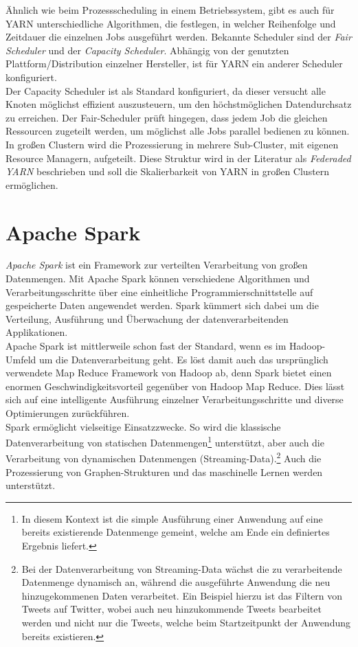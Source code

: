 \noindent
Ähnlich wie beim Prozessscheduling in einem Betriebssystem, gibt es auch für YARN unterschiedliche Algorithmen, die festlegen, in welcher Reihenfolge und Zeitdauer die einzelnen Jobs ausgeführt werden. Bekannte Scheduler sind der \textit{Fair Scheduler} und der \textit{Capacity Scheduler}. Abhängig von der genutzten Plattform/Distribution einzelner Hersteller, ist für YARN ein anderer Scheduler konfiguriert.\\
Der Capacity Scheduler ist als Standard konfiguriert, da dieser versucht alle Knoten möglichst effizient auszusteuern, um den höchstmöglichen Datendurchsatz zu erreichen. Der Fair-Scheduler prüft hingegen, dass jedem Job die gleichen Ressourcen zugeteilt werden, um möglichst alle Jobs parallel bedienen zu können.\\

\noindent
In großen Clustern wird die Prozessierung in mehrere Sub-Cluster, mit eigenen Resource Managern, aufgeteilt. Diese Struktur wird in der Literatur als \textit{Federaded YARN} beschrieben und soll die Skalierbarkeit von YARN in großen Clustern ermöglichen.

\section{Apache Spark}
\label{sec:theory_spark}

\textit{Apache Spark\texttrademark\thinspace} ist ein Framework zur verteilten Verarbeitung von großen Datenmengen. Mit Apache Spark können verschiedene Algorithmen und Verarbeitungsschritte über eine einheitliche Programmierschnittstelle auf gespeicherte Daten  angewendet werden. Spark kümmert sich dabei um die Verteilung, Ausführung und Überwachung der datenverarbeitenden Applikationen.\cite[S. 2]{learning_spark}\\
Apache Spark ist mittlerweile schon fast der Standard, wenn es im Hadoop-Umfeld um die Datenverarbeitung geht. Es löst damit auch das ursprünglich verwendete Map Reduce Framework von Hadoop ab, denn Spark bietet einen enormen Geschwindigkeitsvorteil gegenüber von Hadoop Map Reduce. Dies lässt sich auf eine intelligente Ausführung einzelner Verarbeitungsschritte und diverse Optimierungen zurückführen.\cite[S. 148-153]{expert_hadoop_admin}\\

\noindent
Spark ermöglicht vielseitige Einsatzzwecke. So wird die klassische Datenverarbeitung von statischen Datenmengen\footnote{In diesem Kontext ist die simple Ausführung einer Anwendung auf eine bereits existierende Datenmenge gemeint, welche am Ende ein definiertes Ergebnis liefert.} unterstützt, aber auch die Verarbeitung von dynamischen Datenmengen (Streaming-Data).\footnote{Bei der Datenverarbeitung von Streaming-Data wächst die zu verarbeitende Datenmenge dynamisch an, während die ausgeführte Anwendung die neu hinzugekommenen Daten verarbeitet. Ein Beispiel hierzu ist das Filtern von Tweets auf Twitter, wobei auch neu hinzukommende Tweets bearbeitet werden und nicht nur die Tweets, welche beim Startzeitpunkt der Anwendung bereits existieren.} Auch die Prozessierung von Graphen-Strukturen und das maschinelle Lernen werden unterstützt.\cite[S. 152]{expert_hadoop_admin}\\

